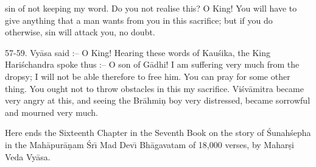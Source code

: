 sin of not keeping my word. Do you not realise this? O King! You will have to give anything that a man wants from you in this sacrifice; but if you do otherwise, sin will attack you, no doubt.

57-59. Vy\=asa said :-- O King! Hearing these words of Kau\'sika, the King Hari\'schandra spoke thus :-- O son of G\=adhi! I am suffering very much from the dropsy; I will not be able therefore to free him. You can pray for some other thing. You ought not to throw obstacles in this my sacrifice. Vi\'sv\=amitra became very angry at this, and seeing the Br\=ahmi\d{n} boy very distressed, became sorrowful and mourned very much.

Here ends the Sixteenth Chapter in the Seventh Book on the story of \'Sunah\'sepha in the Mah\=apur\=a\d{n}am \'Sr\={\i} Mad Dev\={\i} Bh\=agavatam of 18,000 verses, by Mahar\d{s}i Veda Vy\=asa.



